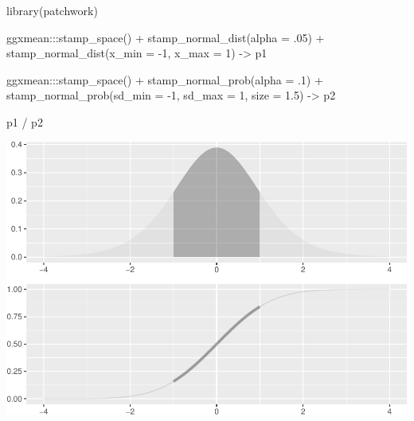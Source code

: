 \documentclass[12pt]{article}
\newenvironment{Shaded}{\begin{snugshade}}{\end{snugshade}}
\newcommand{\AttributeTok}[1]{\textcolor[rgb]{0.77,0.63,0.00}{#1}}
\newcommand{\DecValTok}[1]{\textcolor[rgb]{0.00,0.00,0.81}{#1}}
\newcommand{\FloatTok}[1]{\textcolor[rgb]{0.00,0.00,0.81}{#1}}
\newcommand{\FunctionTok}[1]{\textcolor[rgb]{0.00,0.00,0.00}{#1}}
\newcommand{\NormalTok}[1]{#1}
\newcommand{\OtherTok}[1]{\textcolor[rgb]{0.56,0.35,0.01}{#1}}
\newcommand{\SpecialCharTok}[1]{\textcolor[rgb]{0.00,0.00,0.00}{#1}}
\begin{document}
\begin{Shaded}
\begin{Highlighting}[]
\FunctionTok{library}\NormalTok{(patchwork)}

\NormalTok{ggxmean}\SpecialCharTok{:::}\FunctionTok{stamp\_space}\NormalTok{() }\SpecialCharTok{+}
  \FunctionTok{stamp\_normal\_dist}\NormalTok{(}\AttributeTok{alpha =}\NormalTok{ .}\DecValTok{05}\NormalTok{) }\SpecialCharTok{+}
  \FunctionTok{stamp\_normal\_dist}\NormalTok{(}\AttributeTok{x\_min =} \SpecialCharTok{{-}}\DecValTok{1}\NormalTok{, }\AttributeTok{x\_max =} \DecValTok{1}\NormalTok{) }\OtherTok{{-}\textgreater{}}
\NormalTok{p1}
    
\NormalTok{  ggxmean}\SpecialCharTok{:::}\FunctionTok{stamp\_space}\NormalTok{() }\SpecialCharTok{+}
  \FunctionTok{stamp\_normal\_prob}\NormalTok{(}\AttributeTok{alpha =}\NormalTok{ .}\DecValTok{1}\NormalTok{) }\SpecialCharTok{+}
  \FunctionTok{stamp\_normal\_prob}\NormalTok{(}\AttributeTok{sd\_min =} \SpecialCharTok{{-}}\DecValTok{1}\NormalTok{, }\AttributeTok{sd\_max =} \DecValTok{1}\NormalTok{, }
                             \AttributeTok{size =} \FloatTok{1.5}\NormalTok{) }\OtherTok{{-}\textgreater{}}
\NormalTok{p2}
  
\NormalTok{p1 }\SpecialCharTok{/}\NormalTok{ p2}
\end{Highlighting}
\end{Shaded}

\begin{center}\includegraphics[width=0.5\linewidth]{manuscript_files/figure-latex/unnamed-chunk-13-1} \end{center}
\end{document}
